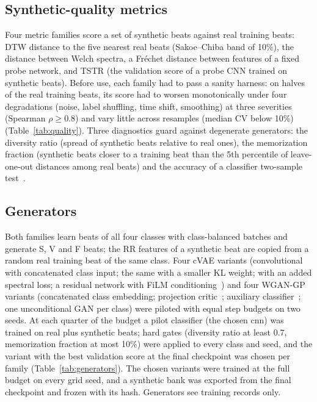 \documentclass[11pt]{article}
\begin{document}
\subsection{Synthetic-quality metrics}
Four metric families score a set of synthetic beats against real training beats: DTW distance to the five
nearest real beats (Sakoe--Chiba band of 10\%), the distance between Welch spectra, a Fr\'echet distance between
features of a fixed probe network, and TSTR (the validation score of a probe CNN trained on synthetic beats).
Before use, each family had to pass a sanity harness: on halves of the real training beats, its score had to
worsen monotonically under four degradations (noise, label shuffling, time shift, smoothing) at three
severities (Spearman $\rho \ge 0.8$) and vary little across resamples (median CV below 10\%)
(Table~\ref{tab:quality}). Three diagnostics guard against degenerate generators: the diversity ratio (spread of
synthetic beats relative to real ones), the memorization fraction (synthetic beats closer to a training beat
than the 5th percentile of leave-one-out distances among real beats) and the accuracy of a classifier two-sample
test~\cite{lopezpaz2017c2st}.
\begin{table}[htbp]\centering\small{}\caption{Sanity tests of the quality metrics.}\label{tab:quality}\end{table}

\subsection{Generators}
Both families learn beats of all four classes with class-balanced batches and generate S, V and F beats; the RR
features of a synthetic beat are copied from a random real training beat of the same class. Four cVAE variants
(convolutional with concatenated class input; the same with a smaller KL weight; with an added spectral loss;
a residual network with FiLM conditioning~\cite{perez2018film}) and four WGAN-GP variants (concatenated class
embedding; projection critic~\cite{miyato2018projection}; auxiliary classifier~\cite{odena2016acgan}; one
unconditional GAN per class) were piloted with equal step budgets on two seeds. At each quarter of the budget a
pilot classifier (the chosen cnn) was trained on real plus synthetic beats; hard gates (diversity ratio at least
0.7, memorization fraction at most 10\%) were applied to every class and seed, and the variant with the best
validation score at the final checkpoint was chosen per family (Table~\ref{tab:generators}). The chosen variants
were trained at the full budget on every grid seed, and a synthetic bank was exported from the final checkpoint
and frozen with its hash. Generators see training records only.
\begin{table}[htbp]\centering\small{}\caption{Generator pilots: pilot score, diagnostics and hard gates.}\label{tab:generators}\end{table}
\end{document}
